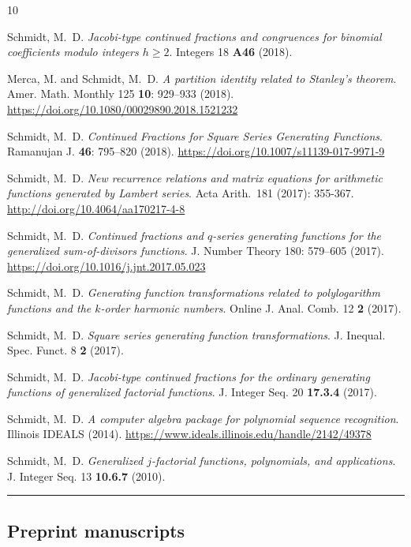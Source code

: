 \documentclass[10pt,reqno,letterpaper]{article}
\theoremstyle{plain}
\numberwithin{theorem}{section}
\theoremstyle{definition}
\newcounter{completeBibitemIncrementCtr}
\renewenvironment{thebibliography}[1]{
     \renewcommand{\refname}{} 
     
     \begin{oldthebibliography}{#1}
     \setlength{\itemsep}{0em}
     \setlength{\parskip}{0em}
     \setlength{\topsep}{0pt}
     \setlength{\partopsep}{0pt}
     \setcounter{enumiv}{\value{completeBibitemIncrementCtr}}
     \footnotesize 
}
{
     \setcounter{completeBibitemIncrementCtr}{\value{enumiv}}
     \end{oldthebibliography}
}
\begin{document}
\begin{thebibliography}{10}
Schmidt, M.~D. \emph{Jacobi-type continued fractions and congruences for 
                     binomial coefficients modulo integers $h \geq 2$}. 
Integers 18 {\bf A46} (2018). 

Merca, M. and Schmidt, M.~D. \emph{A partition identity related to Stanley's theorem}. 
Amer. Math. Monthly 125 {\bf 10}: 929--933 (2018). 
\url{https://doi.org/10.1080/00029890.2018.1521232}

Schmidt, M.~D. \emph{Continued Fractions for Square Series Generating Functions}. 
Ramanujan J. {\bf 46}: 795--820 (2018). 
\url{https://doi.org/10.1007/s11139-017-9971-9}

Schmidt, M.~D. \emph{New recurrence relations and matrix equations for 
                     arithmetic functions generated by Lambert series}. 
Acta Arith. 181 (2017): 355-367. 
\url{http://doi.org/10.4064/aa170217-4-8} 

Schmidt, M.~D. \emph{Continued fractions and $q$-series generating functions for the 
                     generalized sum-of-divisors functions}. 
J. Number Theory 180: 579--605 (2017). 
\url{https://doi.org/10.1016/j.jnt.2017.05.023}

Schmidt, M.~D. \emph{Generating function transformations related to 
                     polylogarithm functions and the $k$-order harmonic numbers}. 
Online J. Anal. Comb. 12 {\bf 2} (2017). 

Schmidt, M.~D. \emph{Square series generating function transformations}. 
J. Inequal. Spec. Funct. 8 {\bf 2} (2017).

Schmidt, M.~D. \emph{Jacobi-type continued fractions for the ordinary generating functions of 
                     generalized factorial functions}. 
J. Integer Seq. 20 {\bf 17.3.4} (2017). 

Schmidt, M.~D. \emph{A computer algebra package for polynomial sequence recognition}. 
Illinois IDEALS (2014). 
\url{https://www.ideals.illinois.edu/handle/2142/49378}

Schmidt, M.~D. \emph{Generalized $j$-factorial functions, polynomials, and applications}. 
J. Integer Seq. 13 {\bf 10.6.7}  (2010).

\end{thebibliography}

\bigskip\hrule\bigskip
\subsection{Preprint manuscripts} 
\end{document}
